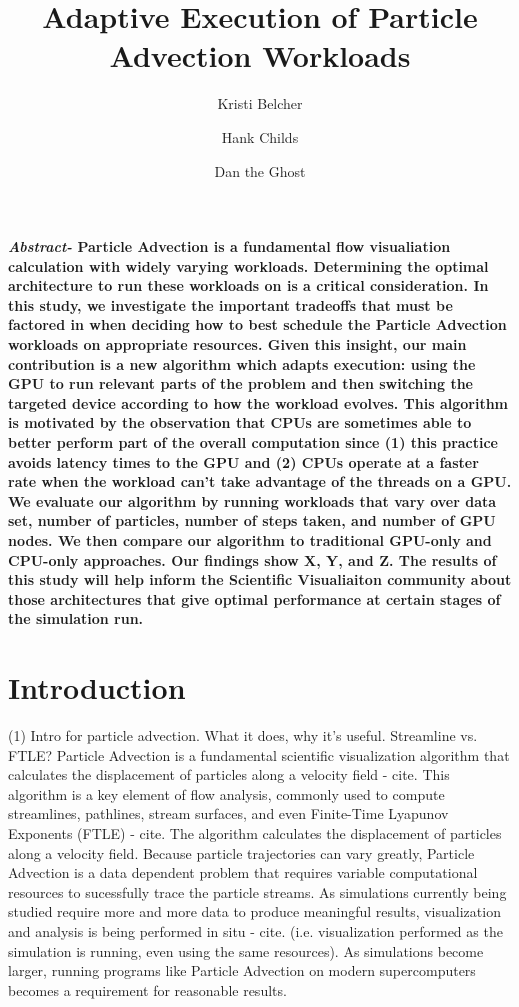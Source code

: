 \documentclass{IEEEtran}
\title{Adaptive Execution of Particle Advection Workloads}
\author[*]{Kristi Belcher}
\author[*]{Hank Childs}
\author[**]{Dan the Ghost}
\affil[*]{University of Oregon}
\affil[**]{Oak Ridge National Lab}
\begin{document}
\maketitle
%
\textbf{\textit{Abstract-} Particle Advection is a fundamental flow visualiation calculation with widely varying workloads. 
%
Determining the optimal architecture to run these workloads on is a critical consideration. 
%
In this study, we investigate the important tradeoffs that must be factored in when deciding how to best schedule the Particle Advection workloads on appropriate resources. 
%
Given this insight, our main contribution is a new algorithm which adapts execution: using the GPU to run relevant parts of the problem and then switching the targeted device according to how the workload evolves.
%
This algorithm is motivated by the observation that CPUs are sometimes able to better perform part of the overall computation since (1) this practice avoids latency times to the GPU and (2) CPUs operate at a faster rate when the workload can't take advantage of the threads on a GPU.
%
We evaluate our algorithm by running workloads that vary over data set, number of particles, number of steps taken, and number of GPU nodes.
%
We then compare our algorithm to traditional GPU-only and CPU-only approaches.
%
Our findings show X, Y, and Z.
%
The results of this study will help inform the Scientific Visualiaiton community about those architectures that give optimal performance at certain stages of the simulation run.}
%
\section{Introduction}
%
(1) Intro for particle advection. What it does, why it's useful. Streamline vs. FTLE?
%
Particle Advection is a fundamental scientific visualization algorithm that calculates the displacement of particles along a velocity field - cite. 
%
This algorithm is a key element of flow analysis, commonly used to compute streamlines, pathlines, stream surfaces, and even Finite-Time Lyapunov Exponents (FTLE) - cite.
%
The algorithm calculates the displacement of particles along a velocity field.
%
Because particle trajectories can vary greatly, Particle Advection is a data dependent problem that requires variable computational resources to sucessfully trace the particle streams.
%
As simulations currently being studied require more and more data to produce meaningful results, visualization and analysis is being performed in situ - cite.
%
(i.e. visualization performed as the simulation is running, even using the same resources).
%
As simulations become larger, running programs like Particle Advection on modern supercomputers becomes a requirement for reasonable results.
\end{document}
